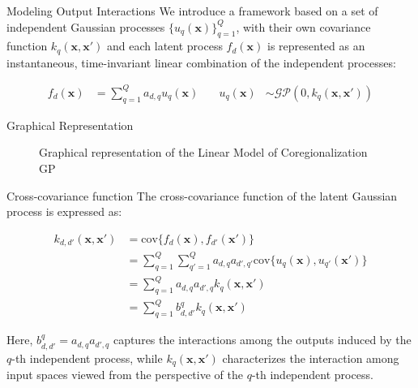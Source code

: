 \begin{frame}{Modeling Output Interactions}
	We introduce a framework based on a set of independent Gaussian processes $\{u_q(\mathbf{x})\}_{q=1}^Q$, with their own covariance function $k_q(\mathbf{x}, \mathbf{x}')$ and each latent process $f_d(\mathbf{x})$ is represented as an instantaneous, time-invariant linear combination of the independent processes:
	
	\begin{equation*}
		\begin{aligned}
			f_{d}(\mathbf{x}) &= \sum_{q=1}^Q a_{d,q} u_{q}(\mathbf{x}) \quad &
			u_{q}(\mathbf{x}) &\sim \mathcal{GP}(0, k_{q}(\mathbf{x}, \mathbf{x}')) 
		\end{aligned}\label{eq:LMC_cov}
	\end{equation*}
	

\end{frame}


\begin{frame}{Graphical Representation}
	\begin{figure}
	\setlength{} 
	\setlength{}
	
	\caption{Graphical representation of the Linear Model of Coregionalization GP} 
	\end{figure}

\end{frame}

\begin{frame}{Cross-covariance function}
	The cross-covariance function of the latent Gaussian process is expressed as:
	
	\begin{equation*}
		\begin{split}
			k_{d,d'}(\mathbf{x}, \mathbf{x}') &= \text{cov}\{f_{d}(\mathbf{x}), f_{d'}(\mathbf{x}')\}\\
			&=\sum_{q=1}^Q \sum_{q'=1}^Q a_{d,q}a_{d',q'}\text{cov}\{u_{q}(\mathbf{x}), u_{q'}(\mathbf{x}')\}\\
			&=\sum_{q=1}^Q a_{d,q}a_{d',q} k_{q}(\mathbf{x}, \mathbf{x}')\\
			&=\sum_{q=1}^Q b^q_{d, d'} k_{q}(\mathbf{x}, \mathbf{x}')
		\end{split}
	\end{equation*}
	
	Here, $b^q_{d, d'} = a_{d,q}a_{d',q}$ captures the interactions among the outputs induced by the $q$-th independent process, while $k_{q}(\mathbf{x}, \mathbf{x}')$ characterizes the interaction among input spaces viewed from the perspective of the $q$-th independent process. 
\end{frame}

